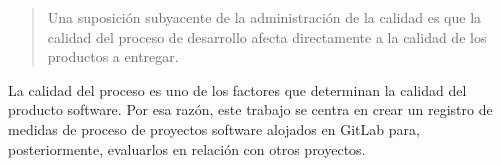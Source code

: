 

\begin{quote}
	Una suposición subyacente de la administración de la calidad es que la calidad del proceso de desarrollo afecta directamente a la calidad de los productos a entregar. \cite{sommerville_ingenierisoftware_2002}
\end{quote}
La calidad del proceso es uno de los factores que determinan la calidad del producto software.
Por esa razón, este trabajo se centra en crear un registro de medidas de proceso de proyectos software alojados en GitLab para, posteriormente, evaluarlos en relación con otros proyectos.

